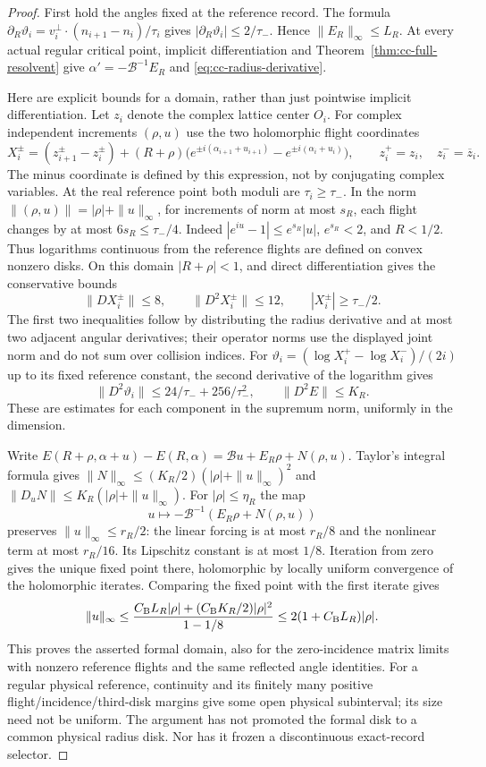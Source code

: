 \begin{proof}
First hold the angles fixed at the reference record.  The formula
$\partial_R\vartheta_i=v_i^\perp\cdot(n_{i+1}-n_i)/\tau_i$
gives $|\partial_R\vartheta_i|\leq2/\tau_-$.  Hence
$\|E_R\|_\infty\leq L_R$.  At every actual regular critical point,
implicit differentiation and Theorem~\ref{thm:cc-full-resolvent} give
$\alpha'=-\mathcal B^{-1}E_R$ and
\eqref{eq:cc-radius-derivative}.

Here are explicit bounds for a domain, rather than just pointwise
implicit differentiation.  Let $z_i$ denote the complex lattice center
$O_i$.  For complex independent increments $(\rho,u)$ use the two
holomorphic flight coordinates
\[
 X_i^\pm=(z_{i+1}^\pm-z_i^\pm)
  +(R+\rho)\bigl(e^{\pm i(\alpha_{i+1}+u_{i+1})}
                         -e^{\pm i(\alpha_i+u_i)}\bigr),
 \qquad z_i^+=z_i,\quad z_i^-=\overline z_i.
\]
The minus coordinate is defined by this expression, not by conjugating
complex variables.  At the real reference point both moduli are
$\tau_i\geq\tau_-$.  In the norm
$\| (\rho,u)\|=|\rho|+\|u\|_\infty$, for increments of norm at
most $s_R$, each flight changes by at most $6s_R\leq\tau_-/4$.
Indeed $|e^{iu}-1|\leq e^{s_R}|u|$, $e^{s_R}<2$, and $R<1/2$.
Thus logarithms continuous from the reference flights are defined
on convex nonzero disks.  On this domain $|R+\rho|<1$, and direct
differentiation gives the conservative bounds
\[
 \|DX_i^\pm\|\leq8,\qquad \|D^2X_i^\pm\|\leq12,
 \qquad |X_i^\pm|\geq\tau_-/2.
\]
The first two inequalities follow by distributing the radius derivative
and at most two adjacent angular derivatives; their operator norms use
the displayed joint norm and do not sum over collision indices.
For $\vartheta_i=(\log X_i^+-\log X_i^-)/(2i)$ up to its fixed
reference constant, the second derivative of the logarithm gives
\[
 \|D^2\vartheta_i\|
 \leq24/\tau_-+256/\tau_-^2,
 \qquad \|D^2E\|\leq K_R.
\]
These are estimates for each component in the supremum norm, uniformly
in the dimension.

Write
$E(R+\rho,\alpha+u)-E(R,\alpha)=\mathcal B u+E_R\rho+N(\rho,u)$.
Taylor's integral formula gives
$\|N\|_\infty\leq(K_R/2)(|\rho|+\|u\|_\infty)^2$ and
$\|D_uN\|\leq K_R(|\rho|+\|u\|_\infty)$.
For $|\rho|\leq\eta_R$ the map
\[
 u\longmapsto-\mathcal B^{-1}(E_R\rho+N(\rho,u))
\]
preserves $\|u\|_\infty\leq r_R/2$: the linear forcing is at most
$r_R/8$ and the nonlinear term at most $r_R/16$.  Its Lipschitz
constant is at most $1/8$.  Iteration from zero gives the unique fixed
point there, holomorphic by locally uniform convergence of the
holomorphic iterates.  Comparing the fixed point with the first
iterate gives
\[
 \|u\|_\infty
 \leq \frac{C_{\rm B}L_R|\rho|+(C_{\rm B}K_R/2)|\rho|^2}{1-1/8}
 \leq 2(1+C_{\rm B}L_R)|\rho|.
\]
This proves the asserted formal domain, also for the zero-incidence
matrix limits with nonzero reference flights and the same reflected
angle identities.  For a regular physical reference, continuity and
its finitely many positive flight/incidence/third-disk margins give
some open physical subinterval; its size need not be uniform.  The
argument has not promoted the formal disk to a common physical radius
disk.  Nor has it frozen a discontinuous exact-record selector.
\end{proof}

